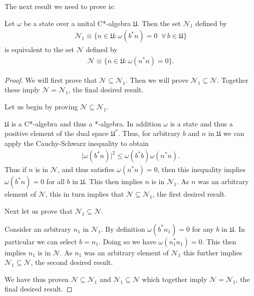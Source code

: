 The next result we need to prove is:

\begin{lemma}
    \label{lmm:lmm1}
    \leanok
    Let $\omega$ be a state over a unital C*-algebra $\mathfrak{U}$. Then the set $\mathcal{N}_1$ defined by
    \begin{align}
        \mathcal{N}_1 \equiv \{ n \in \mathfrak{U} : \omega(b^*n) = 0 \;\; \forall \, b \in \mathfrak{U} \}
    \end{align}
    is equivalent to the set $\mathcal{N}$ defined by
    \begin{align}
        \mathcal{N} \equiv \{ n \in \mathfrak{U} : \omega(n^*n) = 0 \}.
    \end{align}
\end{lemma}
\begin{proof}
\leanok
We will first prove that $\mathcal{N} \subseteq \mathcal{N}_1$. Then we will prove $\mathcal{N}_1 \subseteq \mathcal{N}$. Together these imply $\mathcal{N} = \mathcal{N}_1$, the final desired result.

Let us begin by proving $\mathcal{N} \subseteq \mathcal{N}_1$.

$\mathfrak{U}$ is a C*-algebra and thus a *-algebra. In addition $\omega$ is a state and thus a positive element of the dual space $\mathfrak{U}^*$. Thus, for arbitrary $b$ and $n$ in $\mathfrak{U}$ we can apply the Cauchy-Schwarz inequality to obtain
\begin{align}
    \lvert \omega(b^*n) \rvert^2 \le \omega(b^*b) \omega(n^*n).
\end{align}
Thus if $n$ is in $\mathcal{N}$, and thus satisfies $\omega(n^*n) = 0$, then this inequality implies $\omega(b^*n) = 0$ for all $b$ in $\mathfrak{U}$. This then implies $n$ is in $\mathcal{N}_1$. As $n$ was an arbitrary element of $\mathcal{N}$, this in turn implies that $\mathcal{N} \subseteq \mathcal{N}_1$, the first desired result.

Next let us prove that $\mathcal{N}_1 \subseteq \mathcal{N}$.

Consider an arbitrary $n_1$ in $\mathcal{N}_1$. By definition $\omega(b^*n_1) = 0$ for any $b$ in $\mathfrak{U}$. In particular we can select $b=n_1$. Doing so we have $\omega(n_1^*n_1) = 0$. This then implies $n_1$ is in $\mathcal{N}$. As $n_1$ was an arbitrary element of $\mathcal{N}_1$ this further implies $\mathcal{N}_1 \subseteq \mathcal{N}$, the second desired result.

We have thus proven $\mathcal{N} \subseteq \mathcal{N}_1$ and $\mathcal{N}_1 \subseteq \mathcal{N}$ which together imply $\mathcal{N} = \mathcal{N}_1$, the final desired result.
\end{proof}


